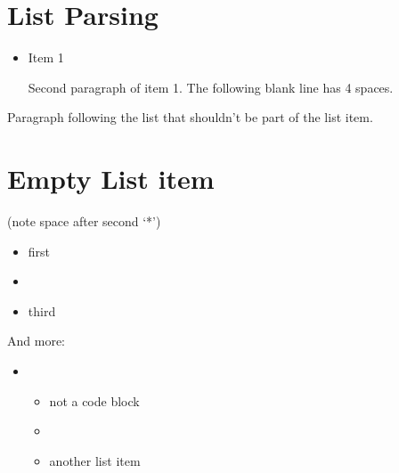 
\def\mytitle{MMD List Parsing Test}


\part{List Parsing}
\label{listparsing}

\begin{itemize}
\item Item 1

Second paragraph of item 1.
The following blank line has 4 spaces.

\end{itemize}

Paragraph following the list that shouldn't be part of the list item.

\part{Empty List item}
\label{emptylistitem}

(note space after second `*')

\begin{itemize}
\item first

\item 

\item third

\end{itemize}

And more:

\begin{itemize}
\item \begin{itemize}
\item not a code block

\item 

\item another list item

\end{itemize}

\end{itemize}




